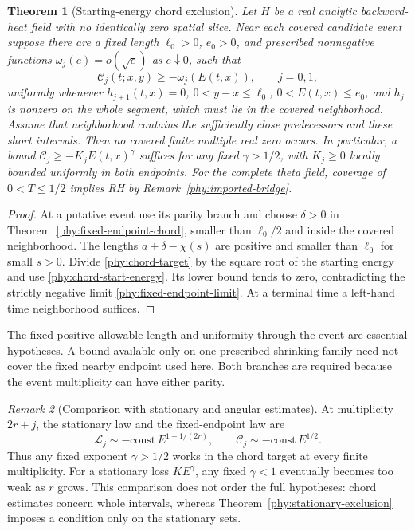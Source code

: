 \documentclass[11pt]{article}
\numberwithin{equation}{section}
\newtheorem{theorem}{Theorem}[section]
\theoremstyle{definition}
\theoremstyle{remark}
\newtheorem{remark}[theorem]{Remark}
\begin{document}
\begin{theorem}[Starting-energy chord exclusion]
\label{phy:chord-exclusion}
Let $H$ be a real analytic backward-heat field with no identically zero
spatial slice.  Near each covered candidate event suppose there are a
fixed length $\ell_0>0$, $e_0>0$, and prescribed nonnegative functions
$\omega_j(e)=o(\sqrt e)$ as $e\downarrow0$, such that
\begin{equation}
 \mathcal C_j(t;x,y)\ge-\omega_j(E(t,x)),\qquad j=0,1,
 \label{phy:chord-target}
\end{equation}
uniformly whenever $h_{j+1}(t,x)=0$, $0<y-x\le\ell_0$,
$0<E(t,x)\le e_0$, and $h_j$ is nonzero on the whole segment, which
must lie in the covered neighborhood.  Assume that neighborhood contains
the sufficiently close predecessors and these short intervals.
Then no covered finite multiple real zero occurs.  In particular, a
bound $\mathcal C_j\ge-K_jE(t,x)^\gamma$ suffices for any fixed
$\gamma>1/2$, with $K_j\ge0$ locally bounded uniformly in both endpoints.
For the complete theta field, coverage of $0<T\le1/2$ implies RH by
Remark~\ref{phy:imported-bridge}.
\end{theorem}
\begin{proof}
At a putative event use its parity branch and choose $\delta>0$ in
Theorem~\ref{phy:fixed-endpoint-chord}, smaller than $\ell_0/2$ and
inside the covered neighborhood.  The lengths $a+\delta-\chi(s)$ are
positive and smaller than $\ell_0$ for small $s>0$.  Divide
\eqref{phy:chord-target} by the square root of the starting energy and
use \eqref{phy:chord-start-energy}.  Its lower bound tends to zero,
contradicting the strictly negative limit
\eqref{phy:fixed-endpoint-limit}.  At a terminal time a left-hand time
neighborhood suffices.
\end{proof}

The fixed positive allowable length and uniformity through the event
are essential hypotheses.  A bound available only on one prescribed
shrinking family need not cover the fixed nearby endpoint used here.
Both branches are required because the event multiplicity can have
either parity.

\begin{remark}[Comparison with stationary and angular estimates]
\label{phy:criterion-comparison}
At multiplicity $2r+j$, the stationary law and the fixed-endpoint law are
\[
 \mathcal L_j\sim-\mathrm{const}\,E^{1-1/(2r)},\qquad
 \mathcal C_j\sim-\mathrm{const}\,E^{1/2}.
\]
Thus any fixed exponent $\gamma>1/2$ works in the chord target at every
finite multiplicity.  For a stationary loss $KE^\gamma$, any fixed
$\gamma<1$ eventually becomes too weak as $r$ grows.  This comparison
does not order the full hypotheses: chord estimates concern whole
intervals, whereas Theorem~\ref{phy:stationary-exclusion} imposes a
condition only on the stationary sets.
\end{remark}
\end{document}
